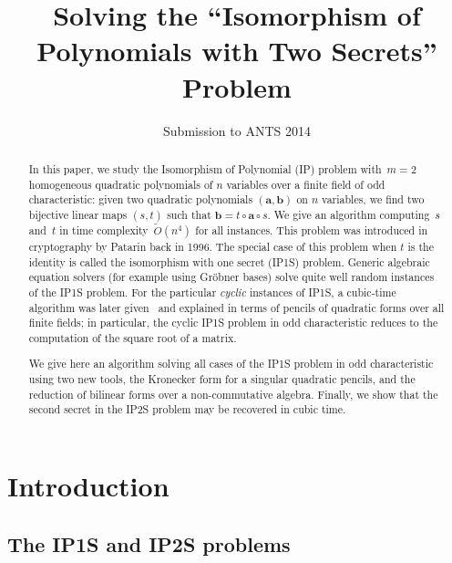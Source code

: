 \documentclass{lms}%
\def\Ot{\widetilde{O}}
\begin{document}
\title[Solving ``Isomorphism of Polynomials with Two Secrets'']%
{Solving the ``Isomorphism of Polynomials with Two Secrets'' Problem}%
\author{Submission to ANTS 2014}
\maketitle

\begin{abstract}%
In this paper, we study the Isomorphism of Polynomial (IP) problem
with~$m=2$ homogeneous quadratic polynomials of $n$ variables over a finite field of odd
characteristic: given two quadratic polynomials $(\bm{a},\bm{b})$ 
on $n$ variables, we find two bijective linear maps $(s,t)$ such that
$\bm{b}=t\circ \bm{a}\circ s$. We give an algorithm computing~$s$ and~$t$
in time complexity~$\Ot(n^4)$ for all instances.
This problem was introduced in cryptography by Patarin back in 1996.
The special case of this problem when $t$ is the identity is called
the isomorphism with one secret (IP1S) problem.
Generic algebraic equation solvers (for example using Gröbner bases)
solve quite well random instances of the IP1S problem. For the particular
\emph{cyclic} instances of IP1S, a cubic-time algorithm was later
given~\cite{MPG2013} and explained in terms of pencils of quadratic forms
over all finite fields; in particular, the cyclic IP1S problem in odd
characteristic reduces to the computation of the square root of a matrix.

We give here an algorithm solving all cases of the IP1S problem in odd
characteristic using two new tools, the Kronecker form for a singular
quadratic pencils, and the reduction of bilinear forms over a non-commutative
algebra. Finally, we show that the second secret in the IP2S problem may
be recovered in cubic time.
\end{abstract}%
\section*{Introduction}%
\subsection*{The IP1S and IP2S problems}%
\end{document}
